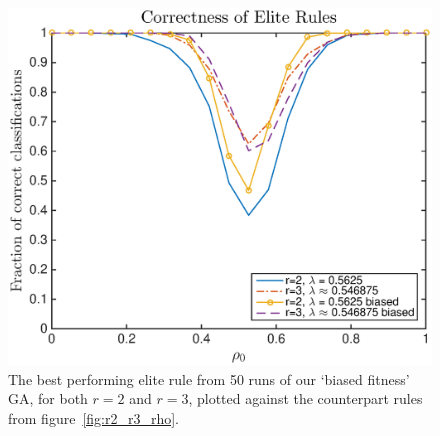 \begin{figure}
\begin{center}
\includegraphics[width=\linewidth]{figures/lambda_biased_correctness_plot.eps}
\caption{The best performing elite rule from 50 runs of our `biased fitness' GA, for both $r = 2$ and $r = 3$, plotted against the counterpart rules from 
figure~\ref{fig:r2_r3_rho}.}
\label{fig:r2_r3_rho_biased}
\end{center}
\end{figure}


